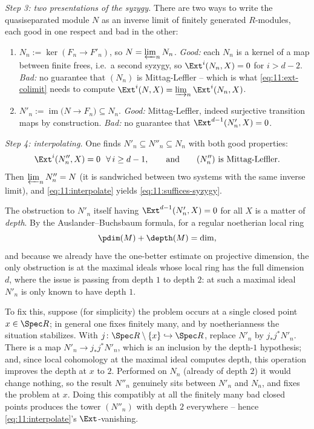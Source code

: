 \emph{Step 3: two presentations of the syzygy.} There are two ways to write the
quasiseparated module $N$ as an inverse limit of finitely generated
$R$-modules, each good in one respect and bad in the other:
\begin{enumerate}
\item $N_{n}:=\ker(F_{n}\to F'_{n})$, so $N=\varprojlim_{n}N_{n}$. \emph{Good:}
each $N_{n}$ is a kernel of a map between finite frees, i.e.\ a second syzygy,
so $\Ext^{i}(N_{n},X)=0$ for $i>d-2$. \emph{Bad:} no guarantee that $(N_{n})$
is Mittag-Leffler -- which is what \eqref{eq:11:ext-colimit} needs to compute
$\Ext^{i}(N,X)=\varinjlim_{n}\Ext^{i}(N_{n},X)$.
\item $N'_{n}:=\operatorname{im}\bigl(N\to F_{n}\bigr)\subseteq N_{n}$.
\emph{Good:} Mittag-Leffler, indeed surjective transition maps by construction.
\emph{Bad:} no guarantee that $\Ext^{d-1}(N'_{n},X)=0$.
\end{enumerate}

\emph{Step 4: interpolating.} One finds $N'_{n}\subseteq N''_{n}\subseteq N_{n}$
with both good properties:
\begin{equation}
\label{eq:11:interpolate}
\Ext^{i}(N''_{n},X)=0\ \ \forall\,i\ge d-1,\qquad\text{and}\qquad (N''_{n})\
\text{is Mittag-Leffler.}
\end{equation}
Then $\varprojlim_{n}N''_{n}=N$ (it is sandwiched between two systems with the
same inverse limit), and \eqref{eq:11:interpolate} yields
\eqref{eq:11:suffices-syzygy}.

The obstruction to $N'_{n}$ itself having $\Ext^{d-1}(N'_{n},X)=0$ for all $X$
is a matter of \emph{depth}. By the Auslander--Buchsbaum formula, for a regular
noetherian local ring
\begin{equation*}
\pdim(M)+\depth(M)=\dim,
\end{equation*}
and because we already have the one-better estimate on projective dimension,
the only obstruction is at the maximal ideals whose local ring has the full
dimension $d$, where the issue is passing from depth $1$ to depth $2$: at such
a maximal ideal $N'_{n}$ is only known to have depth $1$.

To fix this, suppose (for simplicity) the problem occurs at a single closed
point $x\in\Spec R$; in general one fixes finitely many, and by
noetherianness the situation stabilizes. With $j\colon\Spec R\setminus\{x\}
\hookrightarrow\Spec R$, replace $N'_{n}$ by $j_{*}j^{*}N'_{n}$. There is a map
$N'_{n}\to j_{*}j^{*}N'_{n}$, which is an inclusion by the depth-$1$ hypothesis;
and, since local cohomology at the maximal ideal computes depth, this operation
improves the depth at $x$ to $2$. Performed on $N_{n}$ (already of depth $2$) it
would change nothing, so the result $N''_{n}$ genuinely sits between $N'_{n}$
and $N_{n}$, and fixes the problem at $x$. Doing this compatibly at all the
finitely many bad closed points produces the tower $(N''_{n})$ with depth $2$
everywhere -- hence \eqref{eq:11:interpolate}'s $\Ext$-vanishing.

